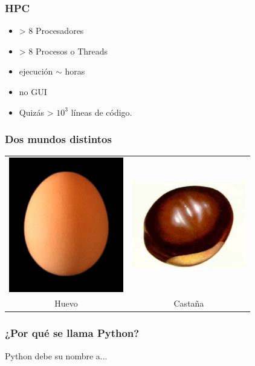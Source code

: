\documentclass{beamer}
\begin{document}
\begin{frame}
\frametitle{HPC}
\begin{itemize}
\item > 8 Procesadores
\item > 8 Procesos o Threads
\item ejecución $\sim$ horas
\item no GUI
\item Quizás > $10^3$ líneas de código.
\end{itemize}
\end{frame}

\begin{frame}
 \frametitle{Dos mundos distintos}
\begin{center}
 \begin{tabular}[h]{cc}
   \includegraphics[width=5cm]{files/huevo.jpg} &
   \includegraphics[width=5cm]{files/castana.jpg}\\
   Huevo & Castaña
 \end{tabular}
\end{center}
\end{frame}


\begin{frame}
 \frametitle{¿Por qué se llama Python?}
 Python debe su nombre a...
\end{frame}
\end{document}
